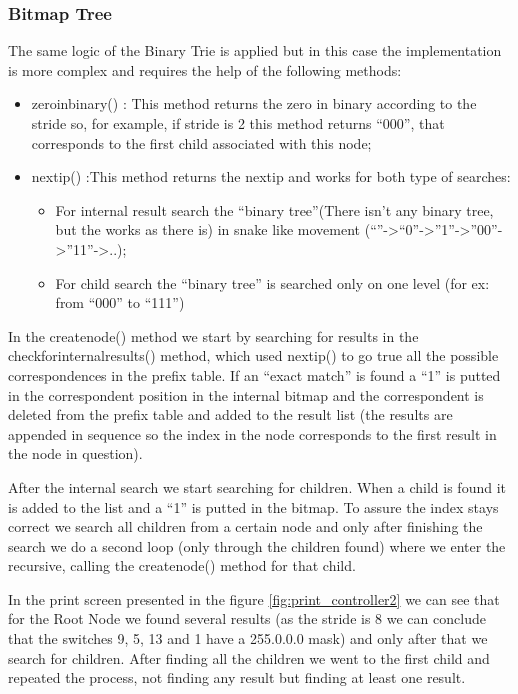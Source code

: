 \documentclass[]{report}
\begin{document}
\subsubsection{Bitmap Tree}
The same logic of the Binary Trie is applied but in this case the implementation is more complex and requires the help of the following methods:
\begin{itemize}
\item zero\textunderscore in\textunderscore binary() : This method returns the zero in binary according to the stride so, for example, if stride is 2 this method returns “000”, that corresponds to the first child associated with this node;
\item next\textunderscore ip() :This method returns the next\textunderscore ip and works for both type of searches:
\begin{itemize}
\item For internal result search the “binary tree”(There isn’t any binary tree, but the works as there is) in snake like movement (“”->“0”->”1”->”00”->”11”->..);
\item For child search the “binary tree” is searched only on one level (for ex: from “000” to “111”)
\end{itemize}
\end{itemize}

In the create\textunderscore node() method we start by searching for results in the check\textunderscore for\textunderscore internal\textunderscore results() method, which used next\textunderscore ip() to go true all the possible correspondences in the prefix table. If an “exact match” is found a “1” is putted in the correspondent position in the internal bitmap and the correspondent is deleted from the prefix table and added to the result list (the results are appended in sequence so the index in the node corresponds to the first result in the node in question).

After the internal search we start searching for children. When a child is found it is added to the list and a “1” is putted in the bitmap. To assure the index stays correct we search all children from a certain node and only after finishing the search we do a second loop (only through the children found) where we enter the recursive, calling the create\textunderscore node() method for that child.

In the print screen presented in the figure \ref{fig:print_controller2} we can see that for the Root Node we found several results (as the stride is 8 we can conclude that the switches 9, 5, 13 and 1 have a 255.0.0.0 mask) and only after that we search for children. After finding all the children we went to the first child and repeated the process, not finding any result but finding at least one result.
\end{document}
